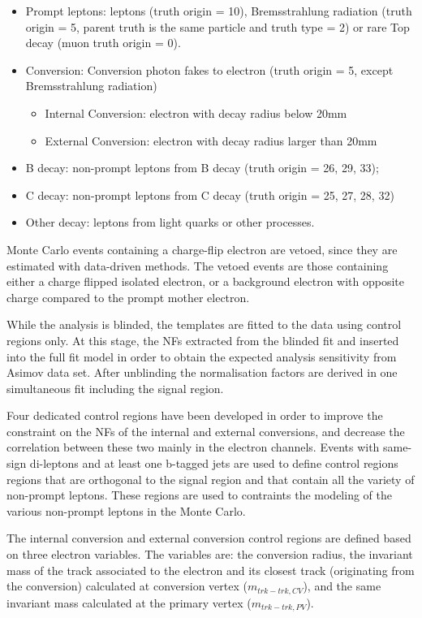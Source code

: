 \begin{itemize}
\item Prompt leptons: leptons (truth origin = 10), Bremsstrahlung radiation (truth origin = 5, parent truth is the same particle and truth type = 2) or rare Top decay (muon truth origin = 0).
\item Conversion: Conversion photon fakes to electron (truth origin = 5, except Bremsstrahlung radiation)
   \begin{itemize}
    \item Internal Conversion: electron with decay radius below 20mm
    \item External Conversion: electron with decay radius larger than 20mm
   \end{itemize}
\item B decay: non-prompt leptons from B decay (truth origin = 26, 29, 33);
\item C decay: non-prompt leptons from C decay (truth origin = 25, 27, 28, 32)
\item Other decay: leptons from light quarks or other processes.
\end{itemize}

Monte Carlo events containing a charge-flip electron are vetoed, since they
are estimated with data-driven methods. The vetoed events are those containing
either a charge flipped isolated electron, or a background electron with
opposite charge compared to the prompt mother electron. 

While the analysis is blinded, the templates are fitted to the data using
control regions only. At this stage, the NFs extracted from the blinded fit
and inserted into the full fit model in order to obtain the expected analysis
sensitivity from Asimov data set. 
After unblinding the normalisation factors are derived
in one simultaneous fit including the signal region.

Four dedicated control regions have been developed in order
to improve the constraint on the NFs of the internal and external conversions,
and decrease the correlation between these two mainly in the electron
channels. Events with same-sign di-leptons and at least one b-tagged jets are used to
define control regions regions that are orthogonal to the signal region
and that contain all the variety of non-prompt leptons. These regions are used
to contraints the modeling of the various non-prompt leptons in the Monte Carlo.
  
The internal conversion and external conversion control regions are defined
based on three electron variables. The variables are: the conversion
radius, the invariant mass of the track associated to the electron and its
closest track (originating from the conversion) calculated at conversion
vertex ($m_{trk-trk, CV}$), and the same invariant mass calculated at the
primary vertex ($m_{trk-trk, PV}$).  

